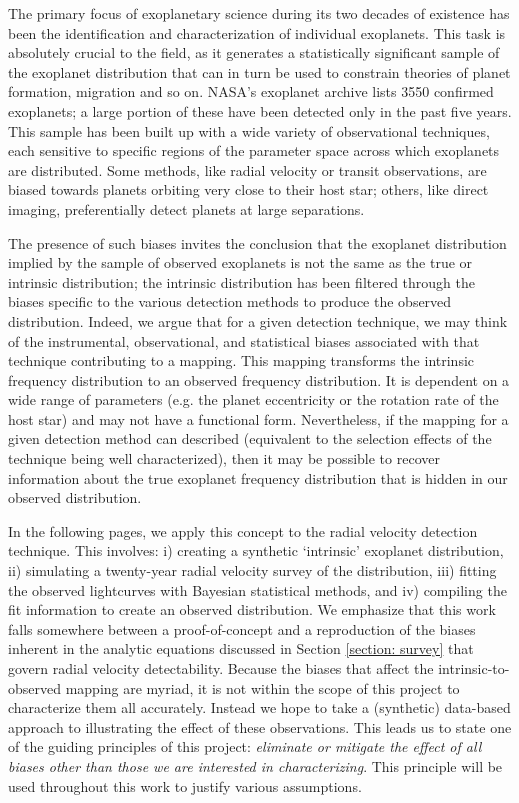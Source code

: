 \documentclass[12pt,manuscript]{aastex}
\begin{document}
The primary focus of exoplanetary science during its two decades of existence has been the identification and characterization of individual exoplanets.
This task is absolutely crucial to the field, as it generates a statistically significant sample of the exoplanet distribution that can in turn be used to constrain theories of planet formation, migration and so on.
NASA's exoplanet archive lists 3550 confirmed exoplanets; a large portion of these have been detected only in the past five years.
This sample has been built up with a wide variety of observational techniques, each sensitive to specific regions of the parameter space across which exoplanets are distributed. Some methods, like radial velocity or transit observations, are biased towards planets orbiting very close to their host star; others, like direct imaging, preferentially detect planets at large separations.

The presence of such biases invites the conclusion that the exoplanet distribution implied by the sample of observed exoplanets is not the same as the true or intrinsic distribution; the intrinsic distribution has been filtered through the biases specific to the various detection methods to produce the observed distribution. Indeed, we argue that for a given detection technique, we may think of the instrumental, observational, and statistical biases associated with that technique contributing to a mapping. This mapping transforms the intrinsic frequency distribution to an observed frequency distribution. It is dependent on a wide range of parameters (e.g. the planet eccentricity or the rotation rate of the host star) and may not have a functional form. Nevertheless, if the mapping for a given detection method can described (equivalent to the selection effects of the technique being well characterized), then it may be possible to recover information about the true exoplanet frequency distribution that is hidden in our observed distribution.

In the following pages, we apply this concept to the radial velocity detection technique. 
This involves: i) creating a synthetic `intrinsic' exoplanet distribution, ii) simulating a twenty-year radial velocity survey of the distribution, iii) fitting the observed lightcurves with Bayesian statistical methods, and iv) compiling the fit information to create an observed distribution. 
We emphasize that this work falls somewhere between a proof-of-concept and a reproduction of the biases inherent in the analytic equations discussed in Section \ref{section: survey} that govern radial velocity detectability.
Because the biases that affect the intrinsic-to-observed mapping are myriad, it is not within the scope of this project to characterize them all accurately. 
Instead we hope to take a (synthetic) data-based approach to illustrating the effect of these observations.
This leads us to state one of the guiding principles of this project:
\textit{eliminate or mitigate the effect of all biases other than those we are interested in characterizing}.
This principle will be used throughout this work to justify various assumptions.
\end{document}

